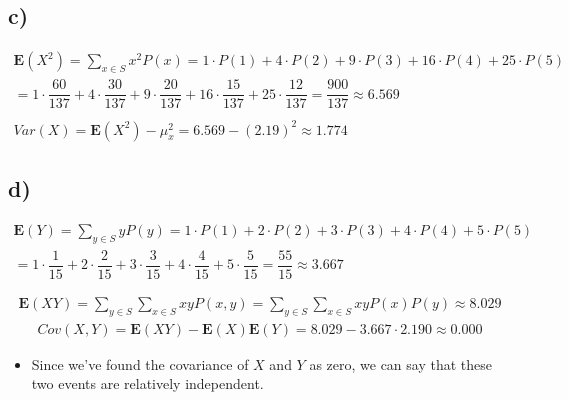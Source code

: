 \documentclass[12pt]{article}
\begin{document}
\subsection*{c)}
\begin{equation*}
    \begin{split}
        \textbf{E}(X^2)= \sum_{x \in S} x^2 P(x) = 1 \cdot P(1) + 4 \cdot P(2) + 9 \cdot P(3) + 16 \cdot P(4) + 25 \cdot P(5) \\
        = 1 \cdot \dfrac{60}{137} + 4 \cdot \dfrac{30}{137} + 9 \cdot \dfrac{20}{137} + 16 \cdot \dfrac{15}{137} + 25 \cdot \dfrac{12}{137} = \dfrac{900}{137} \approx 6.569 \\ \\
        Var(X) = \textbf{E}(X^2) - \mu_x^2 = 6.569-(2.19)^2 \approx 1.774
    \end{split}
 \end{equation*}

\subsection*{d)} 
\begin{equation*}
    \begin{split}
        \textbf{E}(Y)= \sum_{y \in S} y P(y) = 1 \cdot P(1) + 2 \cdot P(2) + 3 \cdot P(3) + 4 \cdot P(4) + 5 \cdot P(5) \\
        = 1 \cdot \dfrac{1}{15} + 2 \cdot \dfrac{2}{15} + 3 \cdot \dfrac{3}{15} + 4 \cdot \dfrac{4}{15} + 5 \cdot \dfrac{5}{15} = \dfrac{55}{15} \approx 3.667 \\ \\
    \end{split}
\end{equation*}
\begin{equation*}
    \begin{split}
        \textbf{E}(XY)= \sum_{y \in S}\sum_{x \in S} xy P(x,y) = \sum_{y \in S}\sum_{x \in S} xy P(x)P(y) \approx 8.029
    \end{split}
\end{equation*}
\begin{equation*}
    \begin{split}
        Cov(X,Y) = \textbf{E}(XY) - \textbf{E}(X)\textbf{E}(Y) = 8.029 - 3.667 \cdot 2.190 \approx 0.000
    \end{split}
\end{equation*}
\begin{itemize}
 \item Since we've found the covariance of $X$ and $Y$ as zero, we can say that these two events are relatively independent.
\end{itemize}
\end{document}
